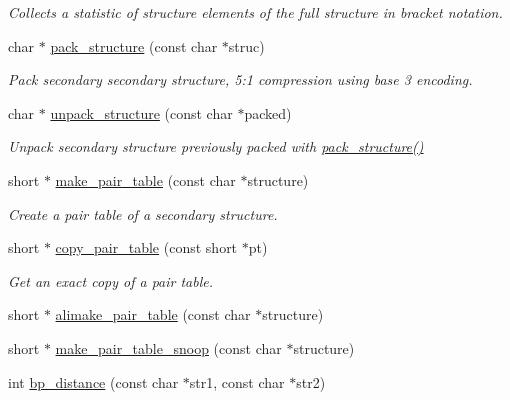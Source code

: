 \begin{DoxyCompactItemize}
\begin{DoxyCompactList}\small\item\em Collects a statistic of structure elements of the full structure in bracket notation. \end{DoxyCompactList}\item 
char $\ast$ \mbox{\hyperlink{group__struct__utils__deprecated_gac6dfa5e22928c087c6e09ff0054a7ced}{pack\+\_\+structure}} (const char $\ast$struc)
\begin{DoxyCompactList}\small\item\em Pack secondary secondary structure, 5\+:1 compression using base 3 encoding. \end{DoxyCompactList}\item 
char $\ast$ \mbox{\hyperlink{group__struct__utils__deprecated_ga071c6921efe1eb974f115ee6fefa3c39}{unpack\+\_\+structure}} (const char $\ast$packed)
\begin{DoxyCompactList}\small\item\em Unpack secondary structure previously packed with \mbox{\hyperlink{group__struct__utils__deprecated_gac6dfa5e22928c087c6e09ff0054a7ced}{pack\+\_\+structure()}} \end{DoxyCompactList}\item 
short $\ast$ \mbox{\hyperlink{group__struct__utils__deprecated_ga89c32307ee50a0026f4a3131fac0845a}{make\+\_\+pair\+\_\+table}} (const char $\ast$structure)
\begin{DoxyCompactList}\small\item\em Create a pair table of a secondary structure. \end{DoxyCompactList}\item 
short $\ast$ \mbox{\hyperlink{group__struct__utils__deprecated_gafeaa6d68eef3a99d0a7aa08aa91c6601}{copy\+\_\+pair\+\_\+table}} (const short $\ast$pt)
\begin{DoxyCompactList}\small\item\em Get an exact copy of a pair table. \end{DoxyCompactList}\item 
short $\ast$ \mbox{\hyperlink{group__struct__utils__deprecated_ga3c81b3967056c3888b8472b65fbb16f5}{alimake\+\_\+pair\+\_\+table}} (const char $\ast$structure)
\item 
short $\ast$ \mbox{\hyperlink{group__struct__utils__deprecated_ga9aa3bf3b4346bb7fb88efc154dd07a79}{make\+\_\+pair\+\_\+table\+\_\+snoop}} (const char $\ast$structure)
\item 
int \mbox{\hyperlink{group__struct__utils__deprecated_ga6ebbcd29a754f0e4f1a66d1fd84184db}{bp\+\_\+distance}} (const char $\ast$str1, const char $\ast$str2)

\end{DoxyCompactItemize}
